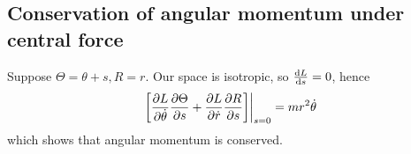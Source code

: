 \subsection{Conservation of angular momentum under central force}
\begin{example}
	Suppose \( \Theta = \theta + s, R = r \).
	Our space is isotropic, so \( \dv{L}{s} = 0 \), hence
	\[
		\eval{\qty[\pdv{L}{\dot\theta}\pdv{\Theta}{s} + \pdv{L}{\dot r}\pdv{R}{s}]}_{s=0} = mr^2\dot\theta
	\]
	which shows that angular momentum is conserved.
\end{example}
